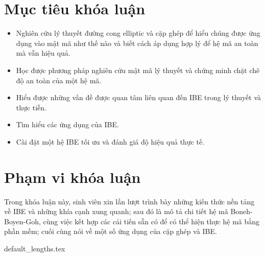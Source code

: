 \documentclass[class=report, crop=false]{standalone}
\begin{document}
	\section{Mục tiêu khóa luận}
		\begin{itemize}
			\item Nghiên cứu lý thuyết đường cong elliptic và cặp ghép để hiểu chúng được ứng dụng vào mật mã như thế nào và biết cách áp dụng hợp lý để hệ mã an toàn mà vẫn hiệu quả.
			\item Học được phương pháp nghiên cứu mật mã lý thuyết và chứng minh chặt chẽ độ an toàn của một hệ mã.
			\item Hiểu được những vấn đề được quan tâm liên quan đến IBE trong lý thuyết và thực tiễn.
			\item Tìm hiểu các ứng dụng của IBE.
			\item Cài đặt một hệ IBE tối ưu và đánh giá độ hiệu quả thực tế.
		\end{itemize}
	\section{Phạm vi khóa luận}
		Trong khóa luận này, sinh viên xin lần lượt trình bày những kiến thức nền tảng về IBE và những khía cạnh xung quanh; sau đó là mô tả chi tiết hệ mã Boneh-Boyen-Goh, cùng việc kết hợp các cải tiến sẵn có để có thể hiện thực hệ mã bằng phần mềm; cuối cùng nói về một số ứng dụng của cặp ghép và IBE.

	\newpage
	{default_lengths.tex}
\end{document}
